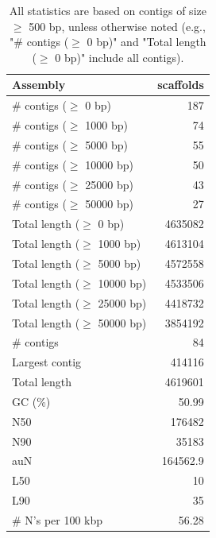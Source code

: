 \documentclass[12pt,a4paper]{article}
\begin{document}
\begin{table}[ht]
\begin{center}
\caption{All statistics are based on contigs of size $\geq$ 500 bp, unless otherwise noted (e.g., "\# contigs ($\geq$ 0 bp)" and "Total length ($\geq$ 0 bp)" include all contigs).}
\begin{tabular}{|l*{1}{|r}|}
\hline
Assembly & scaffolds \\ \hline
\# contigs ($\geq$ 0 bp) & 187 \\ \hline
\# contigs ($\geq$ 1000 bp) & 74 \\ \hline
\# contigs ($\geq$ 5000 bp) & 55 \\ \hline
\# contigs ($\geq$ 10000 bp) & 50 \\ \hline
\# contigs ($\geq$ 25000 bp) & 43 \\ \hline
\# contigs ($\geq$ 50000 bp) & 27 \\ \hline
Total length ($\geq$ 0 bp) & 4635082 \\ \hline
Total length ($\geq$ 1000 bp) & 4613104 \\ \hline
Total length ($\geq$ 5000 bp) & 4572558 \\ \hline
Total length ($\geq$ 10000 bp) & 4533506 \\ \hline
Total length ($\geq$ 25000 bp) & 4418732 \\ \hline
Total length ($\geq$ 50000 bp) & 3854192 \\ \hline
\# contigs & 84 \\ \hline
Largest contig & 414116 \\ \hline
Total length & 4619601 \\ \hline
GC (\%) & 50.99 \\ \hline
N50 & 176482 \\ \hline
N90 & 35183 \\ \hline
auN & 164562.9 \\ \hline
L50 & 10 \\ \hline
L90 & 35 \\ \hline
\# N's per 100 kbp & 56.28 \\ \hline
\end{tabular}
\end{center}
\end{table}
\end{document}

